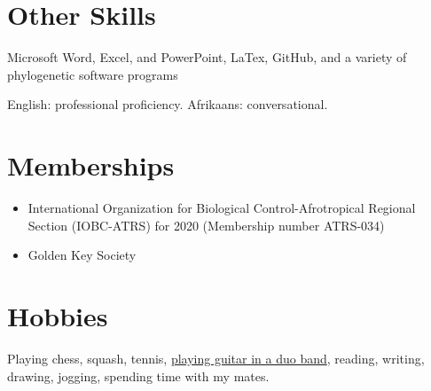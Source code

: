 \documentclass{article}
\begin{document}
\section{Other Skills}
\begin{description}[widest=Languages]
\item[Software] Microsoft Word, Excel, and PowerPoint, LaTex, GitHub, and a variety of phylogenetic software programs
\item[Languages] English: professional proficiency.  Afrikaans: conversational. 
\end{description}

\section{Memberships}
\begin{itemize}
    \item International Organization for Biological Control-Afrotropical Regional Section (IOBC-ATRS) for 2020 (Membership number ATRS-034)
    \item Golden Key Society
\end{itemize}

\section{Hobbies}
Playing chess, squash, tennis, \href{https://www.youtube.com/channel/UC2qRVnmvs5yVTdaBes1ndOA}{playing guitar in a duo band}, reading, writing, drawing, jogging, spending time with my mates.
\end{document}
